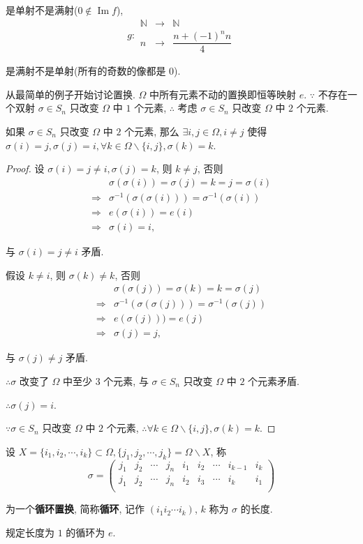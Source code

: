 \documentclass{ctexart}
\begin{document}
是单射不是满射($0\notin\operatorname{Im}f$),
\[g:\begin{array}{rcl}
\mathbb{N} & \to & \mathbb{N} \\
n & \to & \dfrac{n+(-1)^nn}{4}
\end{array}\]

是满射不是单射(所有的奇数的像都是 $0$).

从最简单的例子开始讨论置换. $\Omega$ 中所有元素不动的置换即恒等映射 $e$. $\because$ 不存在一个双射 $\sigma\in S_n$ 只改变 $\Omega$ 中 $1$ 个元素, $\therefore$ 考虑 $\sigma\in S_n$ 只改变 $\Omega$ 中 $2$ 个元素.
\begin{lemma}\label{l1.1}
    如果 $\sigma\in S_n$ 只改变 $\Omega$ 中 $2$ 个元素, 那么 $\exists i,j\in\Omega,i\neq j$ 使得 $\sigma(i)=j,\sigma(j)=i,\forall k\in\Omega\backslash\{i,j\},\sigma(k)=k$.
\end{lemma}
\begin{proof}
    设 $\sigma(i)=j\neq i,\sigma(j)=k$, 则 $k\neq j$, 否则
    \begin{align*}
        & \sigma(\sigma(i))=\sigma(j)=k=j=\sigma(i) \\
        \Rightarrow & \sigma^{-1}(\sigma(\sigma(i)))=\sigma^{-1}(\sigma(i)) \\
        \Rightarrow & e(\sigma(i))=e(i) \\
        \Rightarrow & \sigma(i)=i,
    \end{align*}

    与 $\sigma(i)=j\neq i$ 矛盾.

    假设 $k\neq i$, 则 $\sigma(k)\neq k$, 否则
    \begin{align*}
        & \sigma(\sigma(j))=\sigma(k)=k=\sigma(j) \\
        \Rightarrow & \sigma^{-1}(\sigma(\sigma(j)))=\sigma^{-1}(\sigma(j)) \\
        \Rightarrow & e(\sigma(j)))=e(j) \\
        \Rightarrow & \sigma(j)=j,
    \end{align*}

    与 $\sigma(j)\neq j$ 矛盾.

    $\therefore\sigma$ 改变了 $\Omega$ 中至少 $3$ 个元素, 与 $\sigma\in S_n$ 只改变 $\Omega$ 中 $2$ 个元素矛盾.

    $\therefore\sigma(j)=i$.

    $\because\sigma\in S_n$ 只改变 $\Omega$ 中 $2$ 个元素, $\therefore\forall k\in\Omega\backslash\{i,j\},\sigma(k)=k.$
\end{proof}
\begin{definition}
    设 $X=\{i_1,i_2,\cdots,i_k\}\subset\Omega,\{j_1,j_2,\cdots,j_k\}=\Omega\backslash X$, 称
    \[\sigma=\begin{pmatrix}
        j_1 & j_2 & \cdots & j_n & i_1 & i_2 & \cdots & i_{k-1} & i_k \\
        j_1 & j_2 & \cdots & j_n & i_2 & i_3 & \cdots & i_k & i_1 \\
    \end{pmatrix}\]

    为一个\textbf{循环置换}, 简称\textbf{循环}, 记作 $(i_1i_2\cdots i_k)$, $k$ 称为 $\sigma$ 的长度.

    规定长度为 $1$ 的循环为 $e$.
\end{definition}
\end{document}
